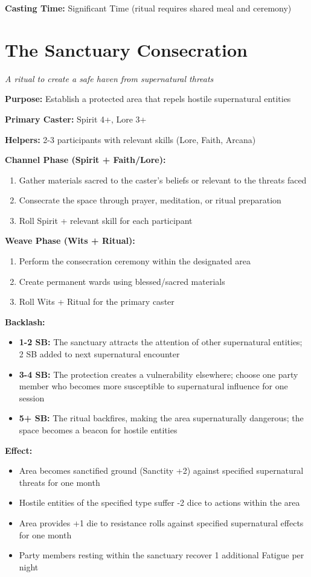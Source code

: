 \documentclass[12pt,twoside]{book}
\begin{document}
\textbf{Casting Time:} Significant Time (ritual requires shared meal and ceremony)

\section*{The Sanctuary Consecration}
\textit{A ritual to create a safe haven from supernatural threats}

\textbf{Purpose:} Establish a protected area that repels hostile supernatural entities

\textbf{Primary Caster:} Spirit 4+, Lore 3+

\textbf{Helpers:} 2-3 participants with relevant skills (Lore, Faith, Arcana)

\textbf{Channel Phase (Spirit + Faith/Lore):}
\begin{enumerate}
\item Gather materials sacred to the caster's beliefs or relevant to the threats faced
\item Consecrate the space through prayer, meditation, or ritual preparation
\item Roll Spirit + relevant skill for each participant
\end{enumerate}

\textbf{Weave Phase (Wits + Ritual):}
\begin{enumerate}
\item Perform the consecration ceremony within the designated area
\item Create permanent wards using blessed/sacred materials
\item Roll Wits + Ritual for the primary caster
\end{enumerate}

\textbf{Backlash:}
\begin{itemize}
\item \textbf{1-2 SB:} The sanctuary attracts the attention of other supernatural entities; 2 SB added to next supernatural encounter
\item \textbf{3-4 SB:} The protection creates a vulnerability elsewhere; choose one party member who becomes more susceptible to supernatural influence for one session
\item \textbf{5+ SB:} The ritual backfires, making the area supernaturally dangerous; the space becomes a beacon for hostile entities
\end{itemize}

\textbf{Effect:}
\begin{itemize}
\item Area becomes sanctified ground (Sanctity +2) against specified supernatural threats for one month
\item Hostile entities of the specified type suffer -2 dice to actions within the area
\item Area provides +1 die to resistance rolls against specified supernatural effects for one month
\item Party members resting within the sanctuary recover 1 additional Fatigue per night
\end{itemize}
\end{document}
